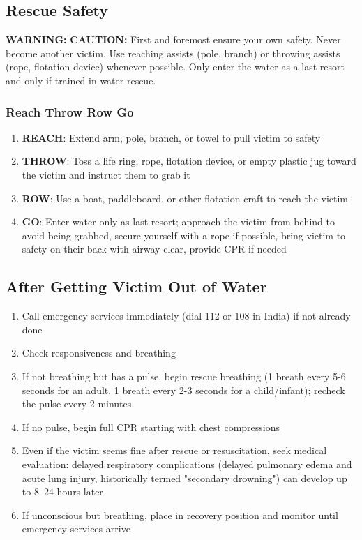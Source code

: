 \subsection{Rescue Safety}

\textbf{WARNING:} \textbf{CAUTION:} First and foremost ensure your own safety. Never become another victim. Use reaching assists (pole, branch) or throwing assists (rope, flotation device) whenever possible. Only enter the water as a last resort and only if trained in water rescue.

\subsubsection{Reach Throw Row Go}

\begin{enumerate}[leftmargin=*]
  \item \textbf{REACH}: Extend arm, pole, branch, or towel to pull victim to safety
  \item \textbf{THROW}: Toss a life ring, rope, flotation device, or empty plastic jug toward the victim and instruct them to grab it
  \item \textbf{ROW}: Use a boat, paddleboard, or other flotation craft to reach the victim
  \item \textbf{GO}: Enter water only as last resort; approach the victim from behind to avoid being grabbed, secure yourself with a rope if possible, bring victim to safety on their back with airway clear, provide CPR if needed
\end{enumerate}
\subsection{After Getting Victim Out of Water}

\begin{enumerate}[leftmargin=*]
  \item Call emergency services immediately (dial 112 or 108 in India) if not already done
  \item Check responsiveness and breathing
  \item If not breathing but has a pulse, begin rescue breathing (1 breath every 5-6 seconds for an adult, 1 breath every 2-3 seconds for a child/infant); recheck the pulse every 2 minutes
  \item If no pulse, begin full CPR starting with chest compressions
  \item Even if the victim seems fine after rescue or resuscitation, seek medical evaluation: delayed respiratory complications (delayed pulmonary edema and acute lung injury, historically termed "secondary drowning") can develop up to 8--24 hours later \cite{erc_drowning}
  \item If unconscious but breathing, place in recovery position and monitor until emergency services arrive
\end{enumerate}

